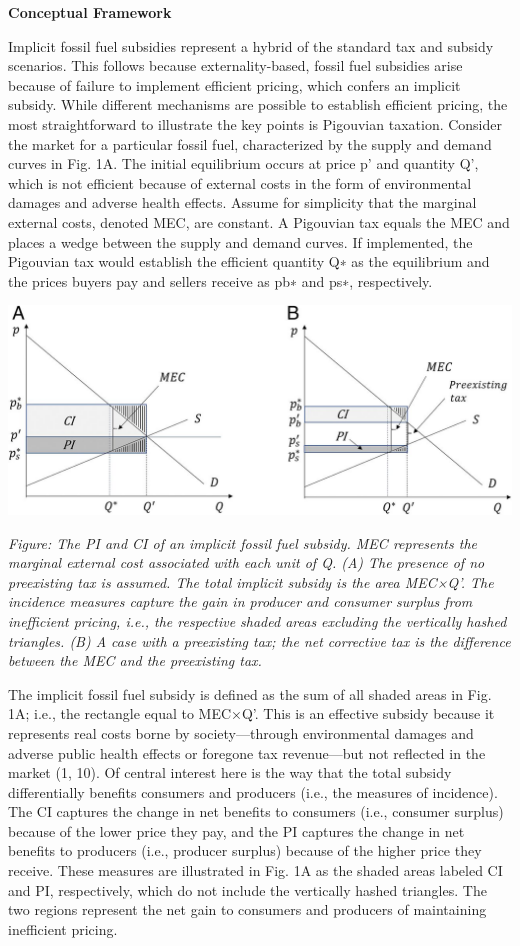 \documentclass[
]{book}
\begin{document}
\textbf{Conceptual Framework}

Implicit fossil fuel subsidies represent a hybrid of the standard tax and subsidy scenarios. This follows because externality-based, fossil fuel subsidies arise because of failure to implement efficient pricing, which confers an implicit subsidy. While different mechanisms are possible to establish efficient pricing, the most straightforward to illustrate the key points is Pigouvian taxation. Consider the market for a particular fossil fuel, characterized by the supply and demand curves in Fig. 1A. The initial equilibrium occurs at price p' and quantity Q', which is not efficient because of external costs in the form of environmental damages and adverse health effects. Assume for simplicity that the marginal external costs, denoted MEC, are constant. A Pigouvian tax equals the MEC and places a wedge between the supply and demand curves. If implemented, the Pigouvian tax would establish the efficient quantity Q∗ as the equilibrium and the prices buyers pay and sellers receive as pb∗ and ps∗, respectively.

\includegraphics{fig/fossil_subsidy.jpg}

\emph{Figure: The PI and CI of an implicit fossil fuel subsidy. MEC represents the marginal external cost associated with each unit of Q. (A) The presence of no preexisting tax is assumed. The total implicit subsidy is the area MEC×Q'. The incidence measures capture the gain in producer and consumer surplus from inefficient pricing, i.e., the respective shaded areas excluding the vertically hashed triangles. (B) A case with a preexisting tax; the net corrective tax is the difference between the MEC and the preexisting tax.}

The implicit fossil fuel subsidy is defined as the sum of all shaded areas in Fig. 1A; i.e., the rectangle equal to MEC×Q'. This is an effective subsidy because it represents real costs borne by society---through environmental damages and adverse public health effects or foregone tax revenue---but not reflected in the market (1, 10). Of central interest here is the way that the total subsidy differentially benefits consumers and producers (i.e., the measures of incidence). The CI captures the change in net benefits to consumers (i.e., consumer surplus) because of the lower price they pay, and the PI captures the change in net benefits to producers (i.e., producer surplus) because of the higher price they receive. These measures are illustrated in Fig. 1A as the shaded areas labeled CI and PI, respectively, which do not include the vertically hashed triangles. The two regions represent the net gain to consumers and producers of maintaining inefficient pricing.
\end{document}
